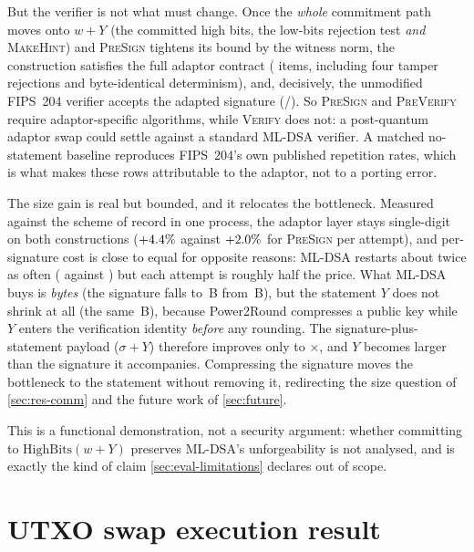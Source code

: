 But the verifier is not what must change. Once the \emph{whole} commitment path
moves onto $w+Y$ (the committed high bits, the low-bits rejection test \emph{and}
\textsc{MakeHint}) and \textsc{PreSign} tightens its bound by the witness norm, the
construction satisfies the full adaptor contract (\mldsaContract{} items, including four
tamper rejections and byte-identical determinism), and, decisively, the unmodified
FIPS~204 verifier accepts the adapted signature (\mldsaRepairedP{}/\mldsaIters{}). So
\textsc{PreSign} and \textsc{PreVerify} require adaptor-specific algorithms, while
\textsc{Verify} does not: a post-quantum adaptor swap could settle against a standard
ML-DSA verifier. A matched no-statement baseline reproduces FIPS~204's own published repetition
rates, which is what makes these rows attributable to the adaptor, not to a porting error.

The size gain is real but bounded, and it relocates the bottleneck. Measured
against the scheme of record in one process, the adaptor layer stays single-digit on both
constructions ($+4.4\%$ against $+2.0\%$ for \textsc{PreSign}
per attempt), and per-signature cost is close to equal for opposite reasons: ML-DSA
restarts about twice as often (\mldsaAttempts{} against \mldsaAttemptsSimp{}) but each
attempt is roughly half the price. What ML-DSA buys is \emph{bytes} (the signature
falls to \mldsaSigBytes{}\,B from \mldsaSigBytesSimp{}\,B), but the statement $Y$ does
not shrink at all (the same \mldsaStmtBytes\,B), because Power2Round compresses
a public key while $Y$ enters the verification identity \emph{before} any rounding. The
signature-plus-statement payload ($\sigma+Y$) therefore improves only to
\mldsaPayloadRatio$\times$, and $Y$ becomes larger
than the signature it accompanies. Compressing the signature moves the bottleneck to the statement without removing it, redirecting the size question of
\cref{sec:res-comm} and the future work of \cref{sec:future}.

This is a functional demonstration, not a security argument: whether committing to
$\mathrm{HighBits}(w+Y)$ preserves ML-DSA's unforgeability is not analysed, and is
exactly the kind of claim \cref{sec:eval-limitations} declares out of scope.

\section{UTXO swap execution result}
\label{sec:res-app}

